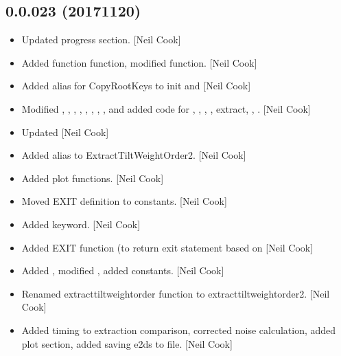 \documentclass[a4paper,10pt,english]{report}
\begin{document}
\subsection{0.0.023 (2017\sphinxhyphen{}11\sphinxhyphen{}20)}
\label{\detokenize{misc/changelog:id547}}\begin{itemize}
\item {} 
Updated progress section. {[}Neil Cook{]}

\item {} 
Added function  function, modified  function.
{[}Neil Cook{]}

\item {} 
Added alias for CopyRootKeys to init and  {[}Neil Cook{]}

\item {} 
Modified , , ,
, ,
, ,
,  and
 added code for , ,
, , extract, ,
. {[}Neil Cook{]}

\item {} 
Updated  {[}Neil Cook{]}

\item {} 
Added alias to ExtractTiltWeightOrder2. {[}Neil Cook{]}

\item {} 
Added  plot functions. {[}Neil Cook{]}

\item {} 
Moved EXIT definition to constants. {[}Neil Cook{]}

\item {} 
Added  keyword. {[}Neil Cook{]}

\item {} 
Added EXIT function (to return exit statement based on 
{[}Neil Cook{]}

\item {} 
Added , modified , added
 constants. {[}Neil Cook{]}

\item {} 
Renamed extracttiltweightorder function to extracttiltweightorder2.
{[}Neil Cook{]}

\item {} 
Added timing to extraction comparison, corrected noise calculation,
added plot section, added saving e2ds to file. {[}Neil Cook{]}

\end{itemize}
\end{document}
